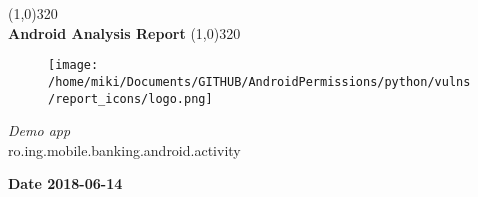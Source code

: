 \documentclass[12p]{article}
\begin{document}
\begin{titlepage}
\begin{center}
\line(1,0){320}\\
[0.25in]
\huge{\bfseries Android Analysis Report}
\line(1,0){320}\\
[0.5in]
\begin{figure}[H]
	\centering
	\texttt{[image: /home/miki/Documents/GITHUB/AndroidPermissions/python/vulns/report\_icons/logo.png]}
\end{figure}
\textsl{\LARGE Demo app}\\
\textsf{\LARGE ro.ing.mobile.banking.android.activity}\\
[2.5in]
\end{center}
\begin{flushright}
\textbf{\large Date 2018-06-14}
\end{flushright}
\end{titlepage}
\tableofcontents
\thispagestyle{empty}
\cleardoublepage
\setcounter{page}{1}
\end{document}
